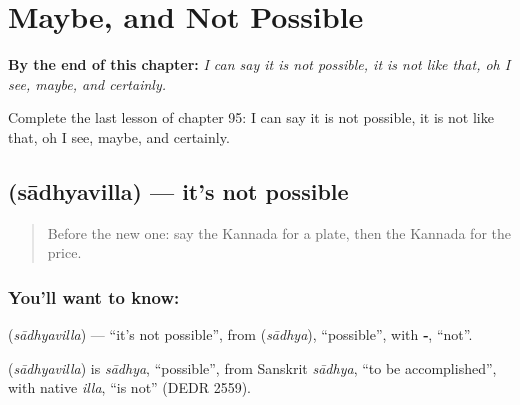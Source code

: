 
\chapter{Maybe, and Not Possible}
\label{ch:ka-maybe-and-not-possible}

\begin{chapteropening}
\textbf{By the end of this chapter:} \emph{I can say it is not possible, it is not like that, oh I see, maybe, and certainly.}

Complete the last lesson of chapter 95: I can say it is not possible, it is not like that, oh I see, maybe, and certainly.
\end{chapteropening}

\section[\texorpdfstring{\kn{ಸಾಧ್ಯವಿಲ್ಲ} (sādhyavilla)}{ಸಾಧ್ಯವಿಲ್ಲ (sādhyavilla)}]{ (sādhyavilla) — it's not possible}

\label{lesson:KA-C95-notpossible}



\begin{quote}
Before the new one: say the Kannada for a plate, then the Kannada for the price.
\end{quote}

\subsection*{You'll want to know: }
\textbf{} (\emph{sādhyavilla}) — \textquotedblleft{}it's not possible\textquotedblright{}, from \textbf{} (\emph{sādhya}), \textquotedblleft{}possible\textquotedblright{}, with \textbf{‑}, \textquotedblleft{}not\textquotedblright{}.

\begin{cousinweb}
\textbf{} (\emph{sādhyavilla}) is \emph{sādhya}, \textquotedblleft{}possible\textquotedblright{}, from Sanskrit \emph{sādhya}, \textquotedblleft{}to be accomplished\textquotedblright{}, with native \emph{illa}, \textquotedblleft{}is not\textquotedblright{} (DEDR 2559).
\end{cousinweb}

